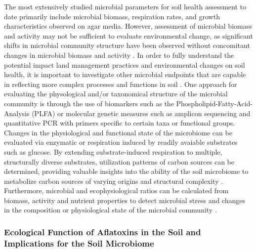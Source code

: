 The most extensively studied microbial parameters for soil health assessment to date primarily include microbial biomass, respiration rates, and growth characteristics observed on agar media. However, assessment of microbial biomass and activity may not be sufficient to evaluate environmental change, as significant shifts in microbial community structure have been observed without concomitant changes in microbial biomass and activity \citep{joergensen2006methods, fliessbach2004short}. In order to  fully understand the potential impact land management practices and environmental changes on soil health, it is important to investigate other microbial endpoints that are capable in reflecting more complex processes and functions in soil \citep{joergensen2006methods}. One approach for evaluating the physological and/or taxonomical structure of the microbial community is through the use of biomarkers such as the Phospholipid-Fatty-Acid-Analysis (PLFA) or molecular genetic measures such as amplicon sequencing and quantitative PCR with primers specific to certain taxa or functional groups. Changes in the physiological and functional state of the microbiome can be evaluated via enzymatic or respiration induced by readily avaiable substrates such as glucose. By extending substrate-induced respiration to multiple, structurally diverse substrates, utilization patterns of carbon sources can be determined, providing valuable insights into the ability of the soil microbiome to metabolize carbon sources of varying origins and structural complexity \citep{campbell2003rapid, chapman2007assessing}. Furthermore, microbial and ecophysiological ratios can be calculated from biomass, activity and nutrient properties to detect microbial stress and changes in the composition or physiological state of the microbial community \citep{joergensen2006methods, blagodatskaya2013active}.

\subsubsection*{Ecological Function of Aflatoxins in the Soil and Implications for the Soil Microbiome} \label{subsubchap:soilhealth_threat} 

